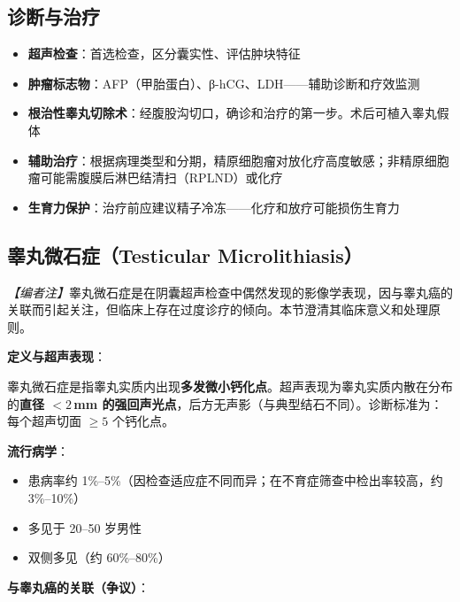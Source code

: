 \subsection{诊断与治疗}

\begin{itemize}[leftmargin=2cm]
	\item \textbf{超声检查}：首选检查，区分囊实性、评估肿块特征
	\item \textbf{肿瘤标志物}：AFP（甲胎蛋白）、β-hCG、LDH——辅助诊断和疗效监测
	\item \textbf{根治性睾丸切除术}：经腹股沟切口，确诊和治疗的第一步。术后可植入睾丸假体
	\item \textbf{辅助治疗}：根据病理类型和分期，精原细胞瘤对放化疗高度敏感；非精原细胞瘤可能需腹膜后淋巴结清扫（RPLND）或化疗
	\item \textbf{生育力保护}：治疗前应建议精子冷冻——化疗和放疗可能损伤生育力
\end{itemize}

\subsection{睾丸微石症（Testicular Microlithiasis）}
\label{subsec:microlithiasis}

\noindent\textit{【编者注】}睾丸微石症是在阴囊超声检查中偶然发现的影像学表现，因与睾丸癌的关联而引起关注，但临床上存在过度诊疗的倾向。本节澄清其临床意义和处理原则。

\vspace{0.5em}
\noindent\textbf{定义与超声表现}：

睾丸微石症是指睾丸实质内出现\textbf{多发微小钙化点}。超声表现为睾丸实质内散在分布的\textbf{直径 $<2\,$mm 的强回声光点}，后方无声影（与典型结石不同）。诊断标准为：每个超声切面 $\geq 5$ 个钙化点。

\vspace{0.5em}
\noindent\textbf{流行病学}：
\begin{itemize}[leftmargin=2cm]
	\item 患病率约 1\%--5\%（因检查适应症不同而异；在不育症筛查中检出率较高，约 3\%--10\%）
	\item 多见于 20--50 岁男性
	\item 双侧多见（约 60\%--80\%）
\end{itemize}

\vspace{0.5em}
\noindent\textbf{与睾丸癌的关联（争议）}：

